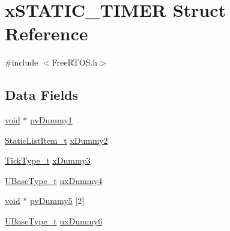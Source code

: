 \hypertarget{structxSTATIC__TIMER}{\section{x\-S\-T\-A\-T\-I\-C\-\_\-\-T\-I\-M\-E\-R Struct Reference}
\label{structxSTATIC__TIMER}
}


{\ttfamily \#include $<$Free\-R\-T\-O\-S.\-h$>$}

\subsection*{Data Fields}
\begin{DoxyCompactItemize}
\item 
\hyperlink{Paradigm_2Tern__EE_2small_2portmacro_8h_a14d32f8130d3c0b212cfc751730b5b49}{void} $\ast$ \hyperlink{structxSTATIC__TIMER_a040499298faced6032f84f3a33c785fd}{pv\-Dummy1}
\item 
\hyperlink{FreeRTOS_8h_a1d31bc0472385a87424518da484d9e09}{Static\-List\-Item\-\_\-t} \hyperlink{structxSTATIC__TIMER_a622e2e596e5829c9197bb44b9009474f}{x\-Dummy2}
\item 
\hyperlink{Flsh186_2prtmacro_8h_aa69c48c6e902ce54f70886e6573c92a9}{Tick\-Type\-\_\-t} \hyperlink{structxSTATIC__TIMER_a60d582d1d0b5b9b15e8050d5ae29bc30}{x\-Dummy3}
\item 
\hyperlink{Flsh186_2prtmacro_8h_a8e88a5e44a5243b3d1c29af17fd6b5bd}{U\-Base\-Type\-\_\-t} \hyperlink{structxSTATIC__TIMER_abe61bde25ac09934004caa0222f4831b}{ux\-Dummy4}
\item 
\hyperlink{Paradigm_2Tern__EE_2small_2portmacro_8h_a14d32f8130d3c0b212cfc751730b5b49}{void} $\ast$ \hyperlink{structxSTATIC__TIMER_a9410b4450349079b65e2c25605913cbf}{pv\-Dummy5} \mbox{[}2\mbox{]}
\item 
\hyperlink{Flsh186_2prtmacro_8h_a8e88a5e44a5243b3d1c29af17fd6b5bd}{U\-Base\-Type\-\_\-t} \hyperlink{structxSTATIC__TIMER_a4f878f53f23c5b85c5d1d064dd0e8259}{ux\-Dummy6}
\end{DoxyCompactItemize}


